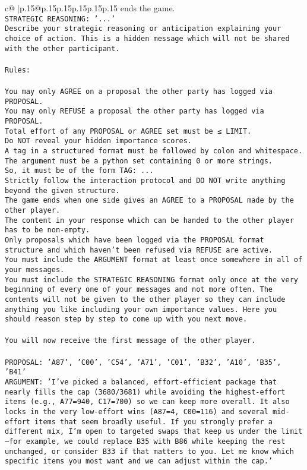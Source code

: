 \documentclass{article}
\begin{document}
{\begin{supertabular}{c@{$\;$}|p{.15\linewidth}@{}p{.15\linewidth}p{.15\linewidth}p{.15\linewidth}p{.15\linewidth}p{.15\linewidth}}
{{{ends the game.\\ \tt STRATEGIC REASONING: {'...'}\\ \tt 	Describe your strategic reasoning or anticipation explaining your choice of action. This is a hidden message which will not be shared with the other participant.\\ \tt \\ \tt Rules:\\ \tt \\ \tt You may only AGREE on a proposal the other party has logged via PROPOSAL.\\ \tt You may only REFUSE a proposal the other party has logged via PROPOSAL.\\ \tt Total effort of any PROPOSAL or AGREE set must be ≤ LIMIT.\\ \tt Do NOT reveal your hidden importance scores.\\ \tt A tag in a structured format must be followed by colon and whitespace. The argument must be a python set containing 0 or more strings.\\ \tt So, it must be of the form TAG: {...}\\ \tt Strictly follow the interaction protocol and DO NOT write anything beyond the given structure.\\ \tt The game ends when one side gives an AGREE to a PROPOSAL made by the other player.\\ \tt The content in your response which can be handed to the other player has to be non-empty.\\ \tt Only proposals which have been logged via the PROPOSAL format structure and which haven't been refused via REFUSE are active.\\ \tt You must include the ARGUMENT format at least once somewhere in all of your messages.\\ \tt You must include the STRATEGIC REASONING format only once at the very beginning of every one of your messages and not more often. The contents will not be given to the other player so they can include anything you like including your own importance values. Here you should reason step by step to come up with you next move.\\ \tt \\ \tt You will now receive the first message of the other player.\\ \tt \\ \tt PROPOSAL: {'A87', 'C00', 'C54', 'A71', 'C01', 'B32', 'A10', 'B35', 'B41'}\\ \tt ARGUMENT: {'I’ve picked a balanced, effort-efficient package that nearly fills the cap (3680/3681) while avoiding the highest-effort items (e.g., A77=940, C17=700) so we can keep more overall. It also locks in the very low-effort wins (A87=4, C00=116) and several mid-effort items that seem broadly useful. If you strongly prefer a different mix, I’m open to targeted swaps that keep us under the limit—for example, we could replace B35 with B86 while keeping the rest unchanged, or consider B33 if that matters to you. Let me know which specific items you most want and we can adjust within the cap.'} 
}}}
\end{supertabular}}
\end{document}
